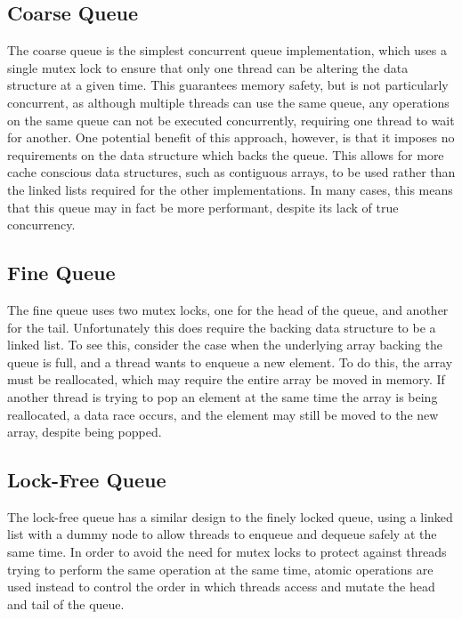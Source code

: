 \documentclass{article}
\begin{document}
\subsection{Coarse Queue}
The coarse queue is the simplest concurrent queue implementation, which uses a
single mutex lock to ensure that only one thread can be altering the data
structure at a given time. This guarantees memory safety, but is not
particularly concurrent, as although multiple threads can use the same queue,
any operations on the same queue can not be executed concurrently, requiring one
thread to wait for another. One potential benefit of this approach, however, is
that it imposes no requirements on the data structure which backs the queue.
This allows for more cache conscious data structures, such as contiguous arrays,
to be used rather than the linked lists required for the other implementations.
In many cases, this means that this queue may in fact be more performant,
despite its lack of true concurrency.

\subsection{Fine Queue}
The fine queue uses two mutex locks, one for the head of the queue, and another
for the tail. Unfortunately this does require the backing data structure to be a
linked list. To see this, consider the case when the underlying array backing
the queue is full, and a thread wants to enqueue a new element. To do this, the
array must be reallocated, which may require the entire array be moved in
memory. If another thread is trying to pop an element at the same time the array
is being reallocated, a data race occurs, and the element may still be moved to
the new array, despite being popped.

\subsection{Lock-Free Queue}
The lock-free queue has a similar design to the finely locked queue, using a
linked list with a dummy node to allow threads to enqueue and dequeue safely at
the same time. In order to avoid the need for mutex locks to protect against
threads trying to perform the same operation at the same time, atomic operations
are used instead to control the order in which threads access and mutate the
head and tail of the queue.
\end{document}
